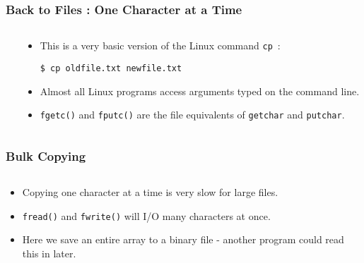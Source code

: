

\begin{frame}[fragile]
\frametitle{Back to Files : One Character at a Time}
\begin{columns}[T]

\begin{column}{0.50\textwidth}

\end{column}

\pause
\begin{column}{0.40\textwidth}
\begin{itemize}[<+->]
\item This is a very basic version of the Linux command \verb^cp^~:
\begin{verbatim}
$ cp oldfile.txt newfile.txt
\end{verbatim}
\item Almost all Linux programs access arguments typed on the command line.
\item \verb^fgetc()^ and \verb^fputc()^ are the file equivalents of \verb^getchar^ and \verb^putchar^.
\end{itemize}
\end{column}


\end{columns}
\end{frame}



\begin{frame}[fragile]
\frametitle{Bulk Copying}
\begin{columns}[T]

\begin{column}{0.40\textwidth}
\begin{itemize}[<+->]
\item Copying one character at a time is very slow for large files.
\item \verb^fread()^ and \verb^fwrite()^ will I/O many characters at once.
\item Here we save an entire array to a binary file - another program could
read this in later.
\end{itemize}
\end{column}

\pause
\begin{column}{0.50\textwidth}

\end{column}


\end{columns}
\end{frame}


